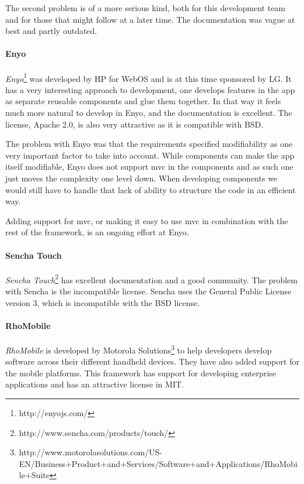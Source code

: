 \documentclass[11pt]{book}
\begin{document}
The second problem is of a more serious kind, both for this development team and for those that might follow at a later time. The documentation was vague at best and partly outdated.

\paragraph{Enyo}
\emph{Enyo}\footnote{http://enyojs.com/} was developed by HP for WebOS and is at this time sponsored by LG.\cite{enyoHistory} It has a very interesting approach to development, one develops features in the app as separate reusable components and glue them together. In that way it feels much more natural to develop in Enyo, and the documentation is excellent. The license, Apache 2.0, is also very attractive as it is compatible with BSD.

The problem with Enyo was that the requirements specified modifiability as one very important factor to take into account. While components can make the app itself modifiable, Enyo does not support \gls{mvc} in the components and as such one just moves the complexity one level down. When developing components we would still have to handle that lack of ability to structure the code in an efficient way.

Adding support for \gls{mvc}, or making it easy to use \gls{mvc} in combination with the rest of the framework, is an ongoing effort at Enyo.

\paragraph{Sencha Touch}
\emph{Sencha Touch}\footnote{http://www.sencha.com/products/touch/} has excellent documentation and a good community. The problem with Sencha is the incompatible license. Sencha uses the General Public License version 3, which is incompatible with the BSD license.\cite{flossLicense}

\paragraph{RhoMobile}
\emph{RhoMobile} is developed by Motorola Solutions\footnote{http://www.motorolasolutions.com/US-EN/Business+Product+and+Services/Software+and+Applications/RhoMobile+Suite} to help developers develop software across their different handheld devices. They have also added support for the mobile platforms. This framework has support for developing enterprise applications and has an attractive license in MIT.
\end{document}

